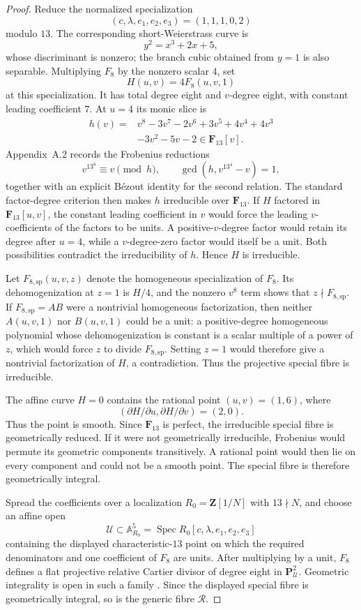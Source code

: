 \documentclass[10pt]{amsart}
\numberwithin{equation}{section}
\theoremstyle{definition}
\theoremstyle{remark}
\newcommand{\PP}{\mathbf P}
\begin{document}
\begin{proof}
Reduce the normalized specialization
\[
 (c,\lambda,e_1,e_2,e_3)=(1,1,1,0,2)
\]
modulo $13$.  The corresponding short-Weierstrass curve is
\[
 y^2=x^3+2x+5,
\]
whose discriminant is nonzero; the branch cubic obtained from $y=1$ is also
separable.  Multiplying $F_8$ by the nonzero scalar $4$, set
\[
 H(u,v)=4F_8(u,v,1)
\]
at this specialization.  It has total degree eight and $v$-degree eight,
with constant leading coefficient $7$.  At $u=4$ its monic slice is
\[
 \begin{aligned}
 h(v)={}&v^8-3v^7-2v^6+3v^5+4v^4+4v^3\\
       &-3v^2-5v-2\in\mathbf F_{13}[v].
 \end{aligned}
\]
Appendix~A.2 records the Frobenius reductions
\[
 v^{13^8}\equiv v\pmod h,
 \qquad
 \gcd(h,v^{13^4}-v)=1,
\]
together with an explicit B\'ezout identity for the second relation.  The
standard factor-degree criterion then makes $h$ irreducible over
$\mathbf F_{13}$.
If $H$ factored in $\mathbf F_{13}[u,v]$, the constant leading coefficient in
$v$ would force the leading $v$-coefficients of the factors to be units.  A
positive-$v$-degree factor would retain its degree after $u=4$, while a
$v$-degree-zero factor would itself be a unit.  Both possibilities contradict
the irreducibility of $h$.  Hence $H$ is irreducible.

Let $F_{8,\mathrm{sp}}(u,v,z)$ denote the homogeneous specialization of
$F_8$.  Its dehomogenization at $z=1$ is $H/4$, and the nonzero $v^8$ term
shows that $z\nmid F_{8,\mathrm{sp}}$.  If
$F_{8,\mathrm{sp}}=AB$ were a nontrivial homogeneous factorization, then
neither $A(u,v,1)$ nor $B(u,v,1)$ could be a unit: a positive-degree
homogeneous polynomial whose dehomogenization is constant is a scalar
multiple of a power of $z$, which would force $z$ to divide
$F_{8,\mathrm{sp}}$.  Setting $z=1$ would therefore give a nontrivial
factorization of $H$, a contradiction.  Thus the projective special fibre is
irreducible.

The affine curve $H=0$ contains the rational point $(u,v)=(1,6)$, where
\[
 (\partial H/\partial u,\partial H/\partial v)=(2,0).
\]
Thus the point is smooth.  Since $\mathbf F_{13}$ is perfect, the irreducible
special fibre is geometrically reduced.  If it were not geometrically
irreducible, Frobenius would permute its geometric components transitively.
A rational point would then lie on every component and could not be a smooth
point.  The special fibre is therefore geometrically integral.

Spread the coefficients over a localization $R_0=\mathbf Z[1/N]$ with
$13\nmid N$, and choose an affine open
\[
 \mathscr U\subset\mathbb A^5_{R_0}
 =\operatorname{Spec}R_0[c,\lambda,e_1,e_2,e_3]
\]
containing the displayed characteristic-$13$ point on which the required
denominators and one coefficient of $F_8$ are units.  After multiplying by a
unit, $F_8$ defines a flat projective relative Cartier divisor of degree eight
in $\PP^2_{\mathscr U}$.  Geometric integrality is open in such a family
\cite[IV$_3$, Th\'eor\`eme~12.2.4\textup{(viii)}]{EGA4}.  Since the displayed
special fibre is geometrically integral, so is the generic fibre
$\mathscr R$.
\end{proof}
\end{document}
